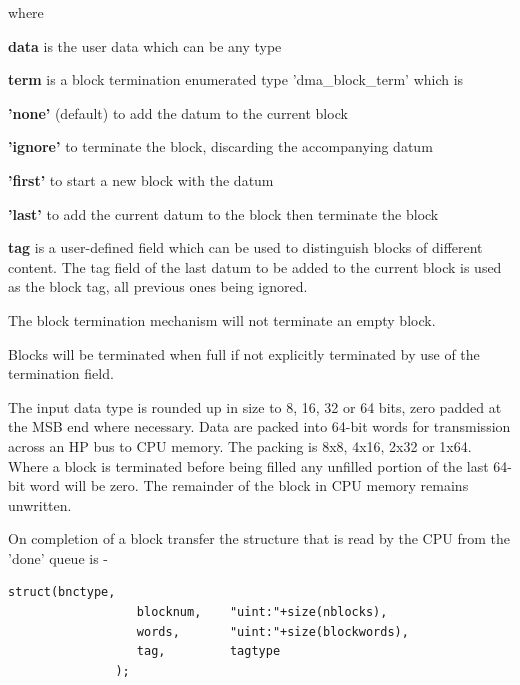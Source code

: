             where\\
            \blist
            \item {\bf data} is the user data which can be any type\\
            \item {\bf term} is a block termination enumerated type
            'dma\_block\_term' which is\\
                \blist
                \item {\bf 'none'} (default) to add the datum to the current block\\
                \item {\bf 'ignore'} to terminate the block, discarding the
                accompanying datum\\
                \item {\bf 'first'} to start a new block with the datum
                \item {\bf 'last'} to add the current datum to the block then
                terminate the block\\
                \blend
            \item {\bf tag} is a user-defined field which can be used to
            distinguish blocks of different content. The tag field of the last
            datum to be added to the current block is used as the block tag, all
            previous ones being ignored.
            \blend
            
            The block termination mechanism will not terminate an empty block.

            Blocks will be terminated when full if not explicitly terminated by use
            of the termination field.

            The input data type is rounded up in size to 8, 16, 32 or 64 bits,
            zero padded at the MSB end where necessary.
            Data are packed into 64-bit words for transmission across an HP bus
            to CPU memory. The packing is 8x8, 4x16, 2x32 or 1x64.
            Where a block is terminated before being filled any unfilled portion of
            the last 64-bit word will be zero. The remainder of the block in CPU
            memory remains unwritten.

            On completion of a block transfer the structure that is read by
            the CPU from the 'done' queue is -

            \begin{lstlisting}[gobble=12, language=threepl]
               struct(bnctype,
                  blocknum,    "uint:"+size(nblocks),
                  words,       "uint:"+size(blockwords),
                  tag,         tagtype
               );
            \end{lstlisting}

